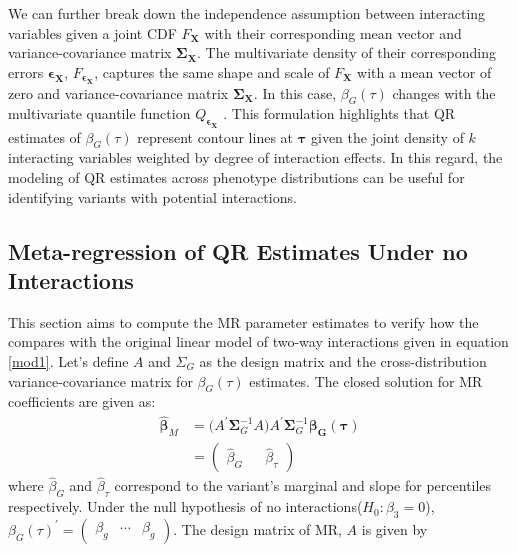 \documentclass[12pt]{article}
\begin{document}
\begin{appendices}
We can further break down the independence assumption between interacting variables given a joint CDF $F_{\bm{X}}$ with their corresponding mean vector and variance-covariance matrix $\bm{\Sigma_X}$. The multivariate density of their corresponding errors $\bm{\epsilon_X}$, $F_{\bm{\epsilon_X}}$, captures the same shape and scale of $F_{\bm{X}}$ with a mean vector of zero and variance-covariance matrix $\bm{\Sigma_X}$. In this case, $\beta_G (\tau)$ changes with the multivariate quantile function $Q_{\bm{\epsilon_X}}$ \cite{chaudhuri1996geometric}. This formulation highlights that QR estimates of $\beta_G (\tau)$ represent contour lines at $\bm{\tau}$ given the joint density of $k$ interacting variables weighted by degree of interaction effects. In this regard, the modeling of QR estimates across phenotype distributions can be useful for identifying variants with potential interactions.

\subsection{Meta-regression of QR Estimates Under no Interactions }
\indent \indent This section aims to compute the MR parameter estimates to verify how the compares with the original linear model of two-way interactions given in equation \ref{mod1}. Let's define $A$ and $\Sigma_G$ as the design matrix and the cross-distribution variance-covariance matrix for $\beta_G (\tau)$ estimates. The closed solution for MR coefficients are given as:
\begin{equation}
\begin{split}
\bm{\widehat{\beta}}_M &= \big(A^{'}\bm{\Sigma}_G^{-1} A \big) A^{'} \bm{ \Sigma}_G^{-1}\bm{\beta_G(\tau)} \\
&=\begin{pmatrix} \widehat{\beta}_G && \widehat{\beta}_\tau \end{pmatrix}
\end{split}
\end{equation}
where $\widehat{\beta}_G$ and $ \widehat{\beta}_\tau$ correspond to the variant's marginal and slope for percentiles respectively. Under the null hypothesis of no interactions($H_0: \beta_3 =0$), 
$\beta_G (\tau)^{'} = \begin{pmatrix} \beta_g & \cdots & \beta_g \end{pmatrix}$. The design matrix of MR, $A$ is given by 


\end{appendices}
\end{document}
